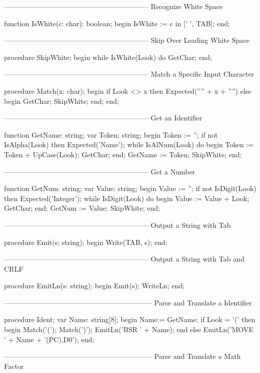 \documentclass[float=false, crop=false]{standalone}
\begin{document}
\begin{code}
{--------------------------------------------------------------}
{ Recognize White Space }

function IsWhite(c: char): boolean;
begin
   IsWhite := c in [' ', TAB];
end;


{--------------------------------------------------------------}
{ Skip Over Leading White Space }

procedure SkipWhite;
begin
   while IsWhite(Look) do
      GetChar;
end;


{--------------------------------------------------------------}
{ Match a Specific Input Character }

procedure Match(x: char);
begin
   if Look <> x then Expected('''' + x + '''')
   else begin
      GetChar;
      SkipWhite;
   end;
end;


{--------------------------------------------------------------}
{ Get an Identifier }

function GetName: string;
var Token: string;
begin
   Token := '';
   if not IsAlpha(Look) then Expected('Name');
   while IsAlNum(Look) do begin
      Token := Token + UpCase(Look);
      GetChar;
   end;
   GetName := Token;
   SkipWhite;
end;


{--------------------------------------------------------------}
{ Get a Number }

function GetNum: string;
var Value: string;
begin
   Value := '';
   if not IsDigit(Look) then Expected('Integer');
   while IsDigit(Look) do begin
      Value := Value + Look;
      GetChar;
   end;
   GetNum := Value;
   SkipWhite;
end;


{--------------------------------------------------------------}
{ Output a String with Tab }

procedure Emit(s: string);
begin
   Write(TAB, s);
end;


{--------------------------------------------------------------}
{ Output a String with Tab and CRLF }

procedure EmitLn(s: string);
begin
   Emit(s);
   WriteLn;
end;


{---------------------------------------------------------------}
{ Parse and Translate a Identifier }

procedure Ident;
var Name: string[8];
begin
   Name:= GetName;
   if Look = '(' then begin
      Match('(');
      Match(')');
      EmitLn('BSR ' + Name);
      end
   else
      EmitLn('MOVE ' + Name + '(PC),D0');
end;


{---------------------------------------------------------------}
{ Parse and Translate a Math Factor }


\end{code}
\end{document}
